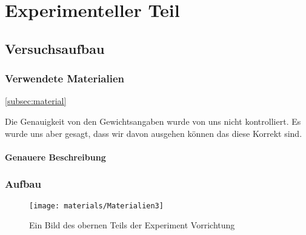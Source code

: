 \documentclass[../main.tex]{subfiles} %
\begin{document}
\chapter{Experimenteller Teil}\label{ch:experimenteller-teil}   
    \section{Versuchsaufbau}\label{sec:versuchsaufbau}
    \subsection{Verwendete Materialien}\label{subsec:versuchsaufbau}
    \ref{subsec:material}\label{zu der Materialliste}
    \begin{tcolorbox}[title=Hinweis zu den Gewichtsangeben]
        Die Genauigkeit von den Gewichtsangaben wurde von uns nicht kontrolliert. Es wurde uns aber gesagt, dass wir davon ausgehen können das diese Korrekt sind.
    \end{tcolorbox}
    \subsubsection{Genauere Beschreibung}\label{subsubsec:materialien}

    \subsection{Aufbau}\label{subsec:aufbau}

    \begin{figure}[H]
        \centering
        \texttt{[image: materials/Materialien3]}
        \caption{Ein Bild des obernen Teils der Experiment Vorrichtung  \textcolor{blue}{\underline{}}}
        \label{fig:material3}
    \end{figure}
\end{document}
